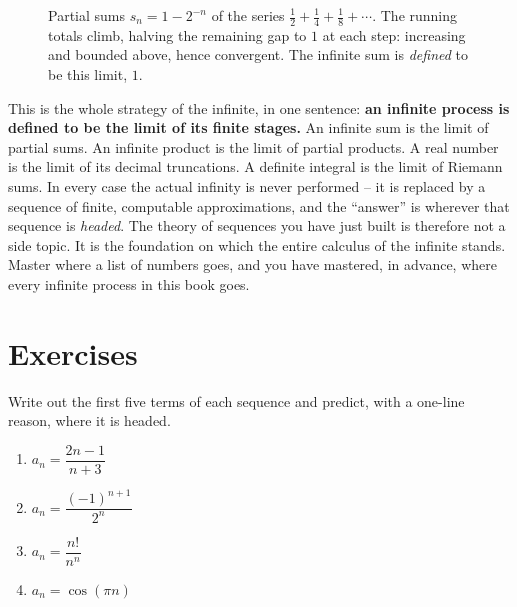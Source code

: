 \begin{figure}[H]
\centering
{}
\caption{Partial sums $s_n = 1 - 2^{-n}$ of the series $\tfrac12 + \tfrac14 +
\tfrac18 + \cdots$. The running totals climb, halving the remaining gap to $1$ at
each step: increasing and bounded above, hence convergent. The infinite sum is
\emph{defined} to be this limit, $1$.}
\label{ch28:fig-partialsums}
\end{figure}

\begin{aestheticbox}
This is the whole strategy of the infinite, in one sentence: \textbf{an infinite
process is defined to be the limit of its finite stages.} An infinite sum is the
limit of partial sums. An infinite product is the limit of partial products. A
real number is the limit of its decimal truncations. A definite integral is the
limit of Riemann sums. In every case the actual infinity is never performed --
it is replaced by a sequence of finite, computable approximations, and
the ``answer'' is wherever that sequence is \emph{headed}. The theory of
sequences you have just built is therefore not a side topic. It is the
foundation on which the entire calculus of the infinite stands. Master where a
list of numbers goes, and you have mastered, in advance, where every infinite
process in this book goes.
\end{aestheticbox}

\chapterline

\section*{Exercises}

\begin{exercise}
\label{ch28:exr-terms}
Write out the first five terms of each sequence and predict, with a one-line
reason, where it is headed.
\begin{enumerate}[label=(\alph*)]
  \item $a_n = \dfrac{2n - 1}{n + 3}$
  \item $a_n = \dfrac{(-1)^{n+1}}{2^n}$
  \item $a_n = \dfrac{n!}{n^n}$
  \item $a_n = \cos(\pi n)$
\end{enumerate}
\end{exercise}

